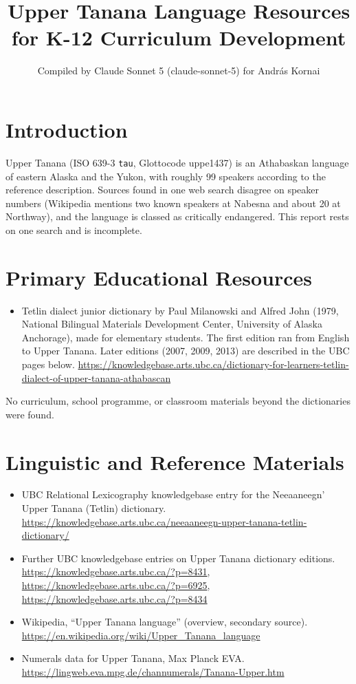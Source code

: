 \documentclass[12pt]{article}
\title{Upper Tanana Language Resources for K-12 Curriculum Development}
\author{Compiled by Claude Sonnet 5 (claude-sonnet-5) for Andr\'as Kornai}
\date{}
\begin{document}
\maketitle

\section{Introduction}
Upper Tanana (ISO 639-3 \texttt{tau}, Glottocode uppe1437) is an Athabaskan language of eastern Alaska and the Yukon, with roughly 99 speakers according to the reference description. Sources found in one web search disagree on speaker numbers (Wikipedia mentions two known speakers at Nabesna and about 20 at Northway), and the language is classed as critically endangered. This report rests on one search and is incomplete.

\section{Primary Educational Resources}
\begin{itemize}
\item Tetlin dialect junior dictionary by Paul Milanowski and Alfred John (1979, National Bilingual Materials Development Center, University of Alaska Anchorage), made for elementary students. The first edition ran from English to Upper Tanana. Later editions (2007, 2009, 2013) are described in the UBC pages below. \url{https://knowledgebase.arts.ubc.ca/dictionary-for-learners-tetlin-dialect-of-upper-tanana-athabascan}
\end{itemize}
No curriculum, school programme, or classroom materials beyond the dictionaries were found.

\section{Linguistic and Reference Materials}
\begin{itemize}
\item UBC Relational Lexicography knowledgebase entry for the Neeaaneegn' Upper Tanana (Tetlin) dictionary. \url{https://knowledgebase.arts.ubc.ca/neeaaneegn-upper-tanana-tetlin-dictionary/}
\item Further UBC knowledgebase entries on Upper Tanana dictionary editions. \url{https://knowledgebase.arts.ubc.ca/?p=8431}, \url{https://knowledgebase.arts.ubc.ca/?p=6925}, \url{https://knowledgebase.arts.ubc.ca/?p=8434}
\item Wikipedia, ``Upper Tanana language'' (overview, secondary source). \url{https://en.wikipedia.org/wiki/Upper_Tanana_language}
\item Numerals data for Upper Tanana, Max Planck EVA. \url{https://lingweb.eva.mpg.de/channumerals/Tanana-Upper.htm}
\end{itemize}
\end{document}
